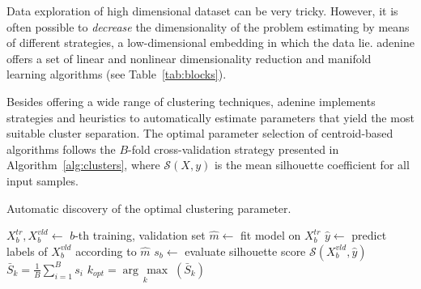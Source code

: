 \documentclass[twoside,11pt]{article}
\makeatletter
\newcommand{\argmax}[1]{\underset{#1}{\operatorname{arg}\,\operatorname{max}}\;}
\newcommand{\ade}{{\sc adenine}\@\xspace}
\makeatother
\begin{document}
  Data exploration of high dimensional dataset can be very tricky.
  However, it is often possible to \emph{decrease} the dimensionality of the problem estimating by means of different strategies, a low-dimensional embedding in which the data lie. %
  \ade offers a set of linear and nonlinear dimensionality reduction and manifold learning algorithms (see Table~\ref{tab:blocks}).

  Besides offering a wide range of clustering techniques,
  \ade implements strategies and heuristics to automatically estimate parameters that yield the most suitable cluster separation.
  The optimal parameter selection of centroid-based algorithms follows the $B$-fold cross-validation strategy presented in Algorithm~\ref{alg:clusters}, where $\mathcal{S}(X,y)$ is the mean silhouette coefficient \citep{rousseeuw1987silhouettes} for all input samples.

  \begin{algorithm}[]
    \small
  \caption{Automatic discovery of the optimal clustering parameter.}\label{alg:clusters}
  \label{alg:clusters}
  \begin{algorithmic}[1]
                  \State $X^{tr}_b,X^{vld}_b\leftarrow$ $b$-th training, validation set
                  \State $\hat{m}\leftarrow$ fit model on $X^{tr}_b$
                  \State $\hat{y}\leftarrow$ predict labels of $X^{vld}_b$ according to $\hat{m}$
                  \State $s_b\leftarrow$ evaluate silhouette score  $\mathcal{S}(X^{vld}_b,\hat{y})$
  	\EndFor
  	\State $\bar{S}_k = \frac{1}{B}\sum_{i=1}^B s_i$
  \EndFor
  \State $k_{opt} = \argmax{k}(\bar{S}_k)$
  \end{algorithmic}
  \end{algorithm}
\end{document}
